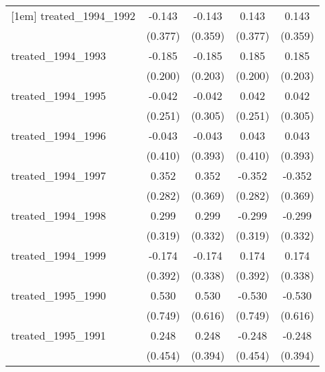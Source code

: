 {\begin{tabular}{l*{4}{c}}
[1em]
treated\_1994\_1992&      -0.143         &      -0.143         &       0.143         &       0.143         \\
            &     (0.377)         &     (0.359)         &     (0.377)         &     (0.359)         \\
[1em]
treated\_1994\_1993&      -0.185         &      -0.185         &       0.185         &       0.185         \\
            &     (0.200)         &     (0.203)         &     (0.200)         &     (0.203)         \\
[1em]
treated\_1994\_1995&      -0.042         &      -0.042         &       0.042         &       0.042         \\
            &     (0.251)         &     (0.305)         &     (0.251)         &     (0.305)         \\
[1em]
treated\_1994\_1996&      -0.043         &      -0.043         &       0.043         &       0.043         \\
            &     (0.410)         &     (0.393)         &     (0.410)         &     (0.393)         \\
[1em]
treated\_1994\_1997&       0.352         &       0.352         &      -0.352         &      -0.352         \\
            &     (0.282)         &     (0.369)         &     (0.282)         &     (0.369)         \\
[1em]
treated\_1994\_1998&       0.299         &       0.299         &      -0.299         &      -0.299         \\
            &     (0.319)         &     (0.332)         &     (0.319)         &     (0.332)         \\
[1em]
treated\_1994\_1999&      -0.174         &      -0.174         &       0.174         &       0.174         \\
            &     (0.392)         &     (0.338)         &     (0.392)         &     (0.338)         \\
[1em]
treated\_1995\_1990&       0.530         &       0.530         &      -0.530         &      -0.530         \\
            &     (0.749)         &     (0.616)         &     (0.749)         &     (0.616)         \\
[1em]
treated\_1995\_1991&       0.248         &       0.248         &      -0.248         &      -0.248         \\
            &     (0.454)         &     (0.394)         &     (0.454)         &     (0.394)         \\

\end{tabular}}
